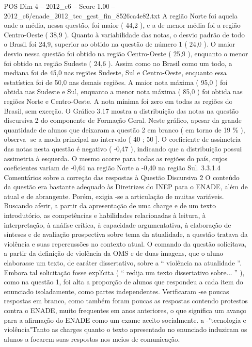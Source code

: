 \begin{textsample}{POS Dim 4 – 2012\_c6 – Score 1.00 – 2012\_c6/enade\_2012\_tec\_gest\_fin\_8526ca4e82.txt}
A região Norte foi aquela onde a média, nessa questão, foi maior ( 44,2 ), e a de menor média foi a região Centro-Oeste ( 38,9 ).
Quanto à variabilidade das notas, o desvio padrão de todo o Brasil foi 24,9, superior ao obtido na questão de número 1 ( 24,0 ).
O maior desvio nessa questão foi obtido na região Centro-Oeste ( 25,9 ), enquanto o menor foi obtido na região Sudeste ( 24,6 ).
Assim como no Brasil como um todo, a mediana foi de 45,0 nas regiões Sudeste, Sul e Centro-Oeste, enquanto essa estatística foi de 50,0 nas demais regiões.
A maior nota máxima ( 95,0 ) foi obtida nas Sudeste e Sul, enquanto a menor nota máxima ( 85,0 ) foi obtida nas regiões Norte e Centro-Oeste.
A nota mínima foi zero em todas as regiões do Brasil, sem exceção.
O Gráfico 3.17 mostra a distribuição das notas na questão discursiva 2 do componente de Formação Geral.
Neste gráfico, apesar da grande quantidade de alunos que deixaram a questão 2 em branco ( em torno de 19 \% ), observa -se a moda principal no intervalo ( 40 ; 50 ].
O coeficiente de assimetria das notas nesta questão é negativo ( -0,47 ), indicando que a distribuição possui assimetria à esquerda.
O mesmo ocorre para todas as regiões do país, cujos coeficientes variam de -0,64 na região Norte a -0,40 na região Sul. 3.3.1.4 Comentários sobre a correção das respostas à Questão Discursiva 2 O conteúdo da questão era bastante adequado às Diretrizes do INEP para o ENADE, além de atual e de abrangente.
Porém, exigia -se a articulação de muitas variáveis.
Buscando aferir, a partir da apresentação de uma charge e de um texto introdutório, as competências e habilidades relacionadas à leitura, à interpretação, à análise crítica, à capacidade argumentativa, à elaboração de sínteses e de avaliação prospectiva sobre tema da atualidade, a questão tratava da violência e suas repercussões no contexto atual.
O comando da questão solicitava, a partir da definição de violência da OMS e de duas imagens, que o aluno elaborasse um texto, de caráter dissertativo, sobre a “ violência na atualidade ”.
Embora tal solicitação fosse explícita ( “ redija um texto dissertativo sobre... ” ), como na questão 1, foi alta a proporção de alunos que respondeu a cada item do enunciado isoladamente, como partes independentes.
Verificaram -se poucas respostas em branco, como também foram poucas as respostas contendo protestos contra o ENADE, muito frequentes em anos anteriores, o que significa um avanço para a afirmação do ENADE como um exame aceito socialmente. a -"tecnologia e violência"Tanto as charges quanto o texto apresentado no enunciado induziram os alunos a focarem suas respostas nos meios de comunicação.

\end{textsample}
